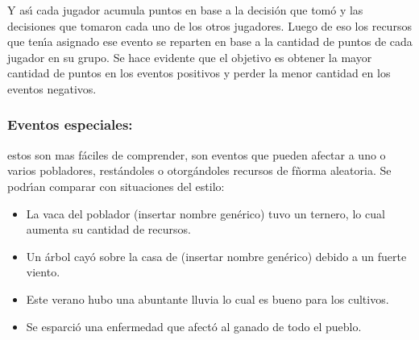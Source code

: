 \documentclass{article}
\begin{document}
Y as\'{\i} cada jugador acumula puntos en base a la decisi\'on que tom\'o y las decisiones que tomaron cada uno de los otros jugadores.
Luego de eso los recursos que ten\'{\i}a asignado ese evento se reparten en base a la cantidad de puntos de cada jugador en su grupo.
Se hace evidente que el objetivo es obtener la mayor cantidad de puntos en los eventos positivos y perder la menor cantidad en los eventos
negativos.

\subsubsection{Eventos especiales: } estos son mas f\'aciles de comprender, son eventos que pueden afectar a uno o varios pobladores, rest\'andoles
o otorg\'andoles recursos de fñorma aleatoria. Se podr\'{\i}an comparar con situaciones del estilo:
\begin{itemize}
      \item La vaca del poblador (insertar nombre gen\'erico) tuvo un ternero, lo cual aumenta su cantidad de recursos.
      \item Un \'arbol cay\'o sobre la casa de (insertar nombre gen\'erico) debido a un fuerte viento.
      \item Este verano hubo una abuntante lluvia lo cual es bueno para los cultivos.
      \item Se esparci\'o una enfermedad que afect\'o al ganado de todo el pueblo.
\end{itemize}
\end{document}
